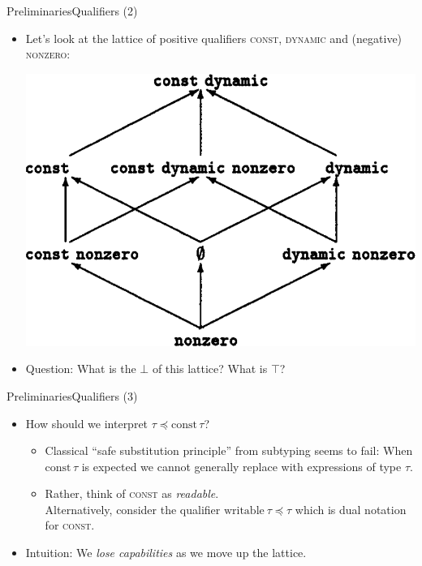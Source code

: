 \documentclass{beamer}
\begin{document}
\begin{frame}{Preliminaries}{Qualifiers (2)}
  \begin{itemize}
  \item Let's look at the lattice of positive qualifiers \textsc{const}, \textsc{dynamic} and (negative) \textsc{nonzero}: 
    \begin{center}\includegraphics[scale=0.25]{paper_qualifierlattice_sample.png}\end{center}
  \item<2-> Question: What is the $\bot$ of this lattice? What is $\top$?\\
  \end{itemize}
\end{frame}

\begin{frame}{Preliminaries}{Qualifiers (3)}
  \begin{itemize}
  \item How should we interpret $\tau \preceq \text{const}\,\tau$?
    \begin{itemize}
    \item<2-> Classical ``safe substitution principle'' from subtyping seems to fail: When $\text{const}\,\tau$ is expected we cannot generally replace with expressions of type $\tau$.
    \item<3-> Rather, think of \textsc{const} as \emph{readable}.\\ Alternatively, consider the qualifier $\text{writable}\ \tau \preceq \tau$ which is dual notation for \textsc{const}.
    \end{itemize}
  \item<4->[$\Rightarrow$] Intuition: We \emph{lose capabilities} as we move up the lattice.
  \end{itemize}
\end{frame}
\end{document}
